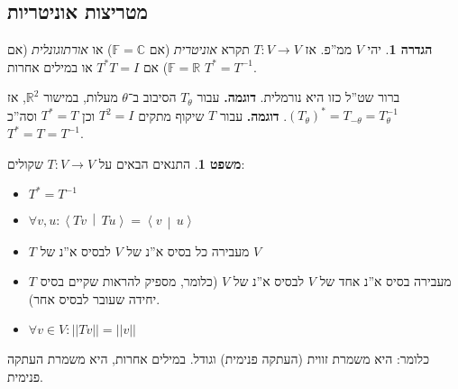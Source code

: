 \documentclass[a4paper]{article}
\newcommand\R     {\mathbb{R}}
\newcommand\C     {\mathbb{C}}
\newcommand\ra    {\rangle}
\newcommand\la    {\langle}
\newcommand\F         {\mathbb{F}}
\newcommand\co        {\colon}
\newcommand\norm[1]   {\left \vert \left \vert #1 \right \vert \right \vert}
\newcommand\mut [2]   {\left \la #1 \,\middle\vert\, #2 \right \ra}
\newcommand\tg        {\theta}
\newcommand\op    {^{-1}}
\theoremstyle{definition}
\newtheorem{Theorem}{משפט}
\newtheorem{definition}{הגדרה}
\newcommand\theo  [1] {\begin{Theorem}#1\end{Theorem}}
\newcommand\defi  [1] {\begin{definition}#1\end{definition}}
\begin{document}
	\subsection{מטריצות אוניטריות}
	\defi{יהי $V$ ממ''פ. אז $T \co V \to V$ תקרא \textit{אוניטרית} (אם $\F = \C$) או \textit{אורתוגונלית} (אם $\F = \R$) אם $T^*T = I$ או במילים אחרות $T^* = T\op$. }
	ברור שט''ל כזו היא נורמלית. 
	\textbf{דוגמה. }עבור $T_\tg$ הסיבוב ב־$\tg$ מעלות, במישור $\R^2$, אז $(T_\tg)^* = T_{-\tg} = T\op_{\tg}$.  
	\textbf{דוגמה. }עבור $T$ שיקוף מתקים $T^2 = I$ וכן $T^* = T$ וסה''כ $T^* = T = T\op$. 
	
	\theo{התנאים הבאים על $T \co V \to V$ שקולים: 
		\begin{itemize}
			\item \hfil $T^* = T\op$
			\item \hfil $\forall v, u \co \mut{Tv}{Tu} = \mut{v}{u}$
			\item $T$ מעבירה כל בסיס א''נ של $V$ לבסיס א''נ של $V$
			\item $T$ מעבירה בסיס א''נ אחד של $V$ לבסיס א''נ של $V$ (כלומר, מספיק להראות שקיים בסיס יחידה שעובר לבסיס אחר). 
			\item \hfil $\forall v \in V \co \norm{Tv} = \norm{v}$
	\end{itemize}}
	כלומר: היא משמרת זווית (העתקה פנימית) וגודל. במילים אחרות, היא משמרת העתקה פנימית. 
\end{document}
